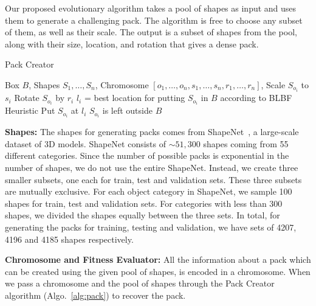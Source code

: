 \documentclass{article}
\begin{document}
Our proposed evolutionary algorithm takes a pool of shapes as input and uses them to generate a challenging pack. The algorithm is free to choose any subset of them, as well as their scale. The output is a subset of shapes from the pool, along with their size, location, and rotation that gives a dense pack. 

\begin{algorithm}[t]
    \caption{Pack Creator}
    \label{alg:pack}
    \begin{algorithmic}
         Box $B$, Shapes $S_1, \dots, S_n$, Chromosome $[o_1, \dots, o_n, s_1, \dots, s_n, r_1, \dots, r_n]$, 
        \STATE Scale $S_{o_i}$ to $s_i$
        \STATE Rotate $S_{o_i}$ by $r_i$ 
            \STATE $l_i$ = best location for putting $S_{o_i}$ in $B$ according to BLBF Heuristic
            \STATE Put $S_{o_i}$ at $l_i$
       \ELSE
            \STATE $S_{o_i}$ is left outside $B$
       \ENDIF
       \ENDFOR
    \end{algorithmic}
\end{algorithm}
\noindent \textbf{Shapes: }The shapes for generating packs comes from ShapeNet~\cite{shapenet2015}, a large-scale dataset of 3D models. ShapeNet consists of $\sim 51,300$ shapes coming from 55 different categories. Since the number of possible packs is exponential in the number of shapes, we do not use the entire ShapeNet. Instead, we create three smaller subsets, one each for train, test and validation sets. These three subsets are mutually exclusive. For each object category in ShapeNet, we sample 100 shapes for train, test and validation sets. For categories with less than 300 shapes, we divided the shapes equally between the three sets. In total, for generating the packs for training, testing and validation, we have sets of 4207, 4196 and 4185 shapes respectively.

\noindent \textbf{Chromosome and Fitness Evaluator: }All the information about a pack which can be created using the given pool of shapes, is encoded in a chromosome. When we pass a chromosome and the pool of shapes through the Pack Creator algorithm (Algo.~\ref{alg:pack}) to recover the pack.  
\end{document}
